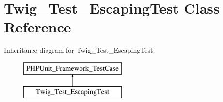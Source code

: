 \hypertarget{classTwig__Test__EscapingTest}{}\section{Twig\+\_\+\+Test\+\_\+\+Escaping\+Test Class Reference}
\label{classTwig__Test__EscapingTest}
Inheritance diagram for Twig\+\_\+\+Test\+\_\+\+Escaping\+Test\+:\begin{figure}[H]
\begin{center}
\leavevmode
\includegraphics[height=2.000000cm]{classTwig__Test__EscapingTest}
\end{center}
\end{figure}
